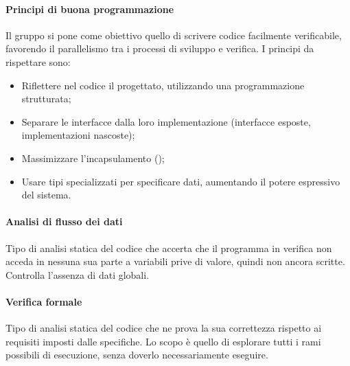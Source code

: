 \paragraph{Principi di buona programmazione}
Il gruppo si pone come obiettivo quello di scrivere codice facilmente verificabile, favorendo il parallelismo tra i processi di sviluppo e verifica. I principi da rispettare sono:
\begin{itemize}
	\item Riflettere nel codice il  progettato, utilizzando una programmazione strutturata;
	\item Separare le interfacce dalla loro implementazione (interfacce esposte, implementazioni nascoste);
	\item Massimizzare l'incapsulamento ();
	\item Usare tipi specializzati per specificare dati, aumentando il potere espressivo del sistema. 
\end{itemize}

\paragraph{Analisi di flusso dei dati} 
Tipo di analisi statica del codice che accerta che il programma in verifica non acceda in nessuna sua parte a variabili prive di valore, quindi non ancora scritte. Controlla l'assenza di dati globali.

\paragraph{Verifica formale} 
Tipo di analisi statica del codice che ne prova la sua correttezza rispetto ai requisiti imposti dalle specifiche. Lo scopo è quello di esplorare tutti i rami possibili di esecuzione, senza doverlo necessariamente eseguire. 

